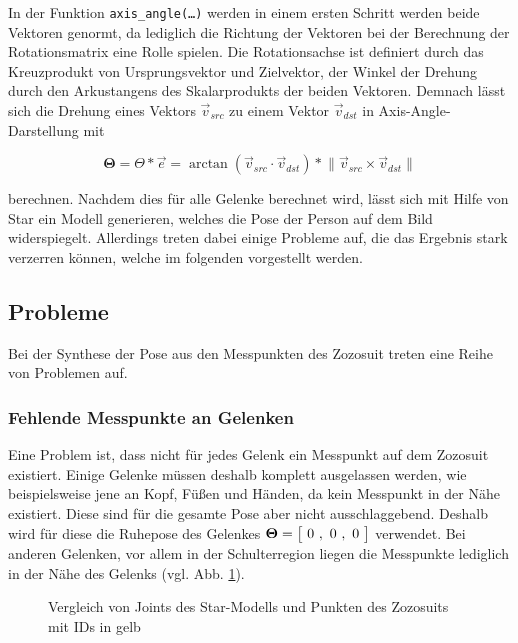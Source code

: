 In der Funktion \texttt{axis\_angle(\dots)} werden in einem ersten Schritt werden beide Vektoren genormt, da lediglich
die Richtung der Vektoren bei der Berechnung der Rotationsmatrix eine Rolle spielen. Die Rotationsachse
ist definiert durch das Kreuzprodukt von Ursprungsvektor und Zielvektor, der Winkel der Drehung durch den
Arkustangens des Skalarprodukts der beiden Vektoren. Demnach lässt sich die Drehung eines Vektors 
$\vec{v}_{src}$ zu einem Vektor $\vec{v}_{dst}$ in Axis-Angle-Darstellung mit

\begin{equation}\label{eq:axis_angle}
  \boldsymbol{\Theta} = \Theta * \vec{e} = \arctan(\vec{v}_{src} \cdot \vec{v}_{dst}) * \lVert \vec{v}_{src} \times \vec{v}_{dst} \rVert
\end{equation}

berechnen. Nachdem dies für alle Gelenke berechnet wird, lässt sich mit Hilfe von Star ein Modell generieren, welches
die Pose der Person auf dem Bild widerspiegelt. Allerdings treten dabei einige Probleme auf, die das Ergebnis
stark verzerren können, welche im folgenden vorgestellt werden.

\subsection{Probleme}
Bei der Synthese der Pose aus den Messpunkten des Zozosuit treten eine Reihe von Problemen auf.

\subsubsection*{Fehlende Messpunkte an Gelenken}
Eine Problem ist, dass nicht für jedes Gelenk ein Messpunkt auf dem Zozosuit existiert. Einige
Gelenke müssen deshalb komplett ausgelassen werden, wie beispielsweise jene an Kopf, Füßen und Händen, da kein Messpunkt in der
Nähe existiert. Diese sind für die gesamte Pose aber nicht ausschlaggebend. Deshalb wird für diese die Ruhepose des Gelenkes
$\boldsymbol{\Theta}=\irow{0 \ , \ 0 \ ,\ 0}$ verwendet. Bei anderen Gelenken, vor allem in der Schulterregion liegen die Messpunkte
lediglich in der Nähe des Gelenks (vgl. Abb. \ref{fig:schulter}).

\begin{figure}[H]
  \centering 
   \qquad 
  \caption{Vergleich von Joints des Star-Modells und Punkten des Zozosuits mit IDs in gelb} 
  \label{fig:schulter}
\end{figure}

